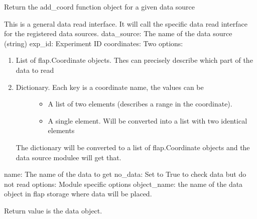 \documentclass[letterpaper,10pt,english]{sphinxmanual}
\begin{document}

\begin{fulllineitems}
\label{\detokenize{data_object:flap.data_object.get_addcoord_function}}
Return the add\_coord function object for a given data source

\end{fulllineitems}


\begin{fulllineitems}
\label{\detokenize{data_object:flap.data_object.get_data}}
This is a general data read interface. It will call the specific data read interface
for the registered data sources.
data\_source: The name of the data source (string)
exp\_id: Experiment ID
coordinates: Two options:
\begin{enumerate}
%
\item {} 
List of flap.Coordinate objects. Thes can precisely describe which part of the data to read

\item {} \begin{description}
\item[{Dictionary. Each key is a coordinate name, the values can be}] \leavevmode\begin{itemize}
\item {} 
A list of two elements (describes a range in the coordinate).

\item {} 
A single element. Will be converted into a list with two identical elements

\end{itemize}

\end{description}

The dictionary will be converted to a list of flap.Coordinate objects and
the data source modulee will get that.

\end{enumerate}

name: The name of the data to get
no\_data: Set to True to check data but do not read
options: Module specific options
object\_name: the name of the data object in flap storage where data will be placed.

Return value is the data object.

\end{fulllineitems}
\end{document}
